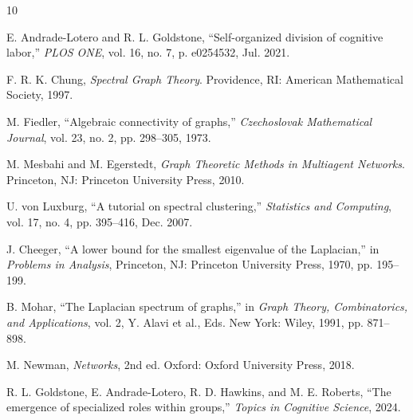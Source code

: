 \documentclass[conference]{IEEEtran}
\begin{document}

\begin{thebibliography}{10}

E. Andrade-Lotero and R. L. Goldstone, ``Self-organized division of cognitive labor,'' \textit{PLOS ONE}, vol. 16, no. 7, p. e0254532, Jul. 2021.

F. R. K. Chung, \textit{Spectral Graph Theory}. Providence, RI: American Mathematical Society, 1997.

M. Fiedler, ``Algebraic connectivity of graphs,'' \textit{Czechoslovak Mathematical Journal}, vol. 23, no. 2, pp. 298--305, 1973.

M. Mesbahi and M. Egerstedt, \textit{Graph Theoretic Methods in Multiagent Networks}. Princeton, NJ: Princeton University Press, 2010.

U. von Luxburg, ``A tutorial on spectral clustering,'' \textit{Statistics and Computing}, vol. 17, no. 4, pp. 395--416, Dec. 2007.

J. Cheeger, ``A lower bound for the smallest eigenvalue of the Laplacian,'' in \textit{Problems in Analysis}, Princeton, NJ: Princeton University Press, 1970, pp. 195--199.

B. Mohar, ``The Laplacian spectrum of graphs,'' in \textit{Graph Theory, Combinatorics, and Applications}, vol. 2, Y. Alavi et al., Eds. New York: Wiley, 1991, pp. 871--898.

M. Newman, \textit{Networks}, 2nd ed. Oxford: Oxford University Press, 2018.

R. L. Goldstone, E. Andrade-Lotero, R. D. Hawkins, and M. E. Roberts, ``The emergence of specialized roles within groups,'' \textit{Topics in Cognitive Science}, 2024.

\end{thebibliography}
\end{document}
